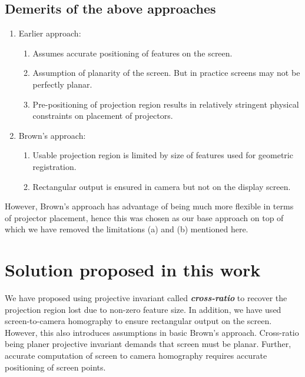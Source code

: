 \documentclass{article}
\begin{document}
\subsection{Demerits of the above approaches}
\begin{enumerate}
\item Earlier approach:
\begin{enumerate}
\item Assumes accurate positioning of features on the screen.
\item Assumption of planarity of the screen. But in practice screens may not be perfectly planar.
\item Pre-positioning of projection region results in relatively stringent physical constraints on placement of projectors.
\end{enumerate}
\item Brown's\cite{1} approach:
\begin{enumerate}
\item Usable projection region is limited by size of features used for geometric registration.
\item Rectangular output is ensured in camera but not on the display screen. 
\end{enumerate}
\end{enumerate}
However, Brown's approach has advantage of being much more flexible in terms of projector placement, hence this was chosen as our base approach on top of which we have removed the limitations (a) and (b) mentioned here.


\section{Solution proposed in this work}
    We have proposed using projective invariant called \textbf{\textit{cross-ratio}} to recover the projection region lost due to non-zero feature size. In addition, we have used screen-to-camera homography to ensure rectangular output on the screen. However, this also introduces assumptions in basic Brown's approach. Cross-ratio being planer projective invariant demands that screen must be planar. Further, accurate computation of screen to camera homography requires accurate positioning of screen points.
\end{document}
